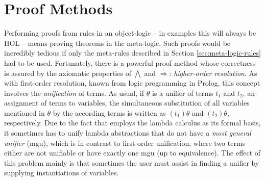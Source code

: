  

\section{Proof Methods}
\label{sec:proof-methods}

Performing proofs from rules in an object-logic -- in examples this will always
be HOL -- means proving theorems in the meta-logic. Such proofs would be
incredibly tedious if only the meta-rules described in Section
\ref{sec:meta-logic-rules} had to be used. Fortunately, there is a powerful
proof method whose correctness is assured by the axiomatic properties of $\bigwedge$ and
$\Longrightarrow$: \emph{higher-order resolution}. As with first-order resolution, known from
logic programming in Prolog, this concept involves the \emph{unification} of
terms. As usual, if $\theta$ is a unifier of terms $t_1$ and $t_2$, \IE an assignment
of terms to variables, the simultaneous substitution of all variables mentioned
in $\theta$ by the according terms is written as $(t_1)\theta$ and $(t_2)\theta$, respectively.
Due to the fact that \Isabelle employs the lambda calculus as its formal basis,
it sometimes has to unify lambda abstractions that do not have a \emph{most
  general unifier} (mgu), which is in contrast to first-order unification, where
two terms either are not unifiable or have exactly one mgu (up to equivalence).
The effect of this problem mainly is that sometimes the user must assist
\Isabelle in finding a unifier by supplying instantiations of variables.


